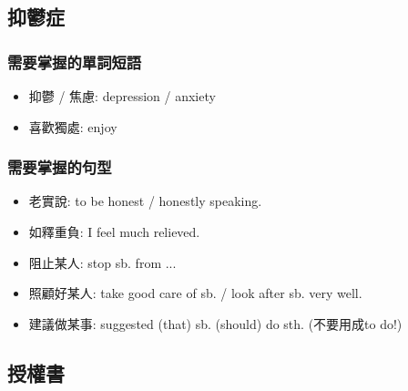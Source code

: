 \subsection{抑鬱症}
\subsubsection*{需要掌握的單詞短語}
\begin{itemize}
  \itemsep0em
  \item 抑鬱 / 焦慮: depression / anxiety
  \item 喜歡獨處: enjoy 
\end{itemize}

\subsubsection*{需要掌握的句型}
\begin{itemize}
  \itemsep0em
  \item 老實說: to be honest / honestly speaking.
  \item 如釋重負: I feel much relieved.
  \item 阻止某人: stop sb. from ...
  \item 照顧好某人: take good care of sb. / look after sb. very well.
  \item 建議做某事: suggested (that) sb. (should) do sth. (不要用成to do!)
\end{itemize}

\subsection{授權書}
